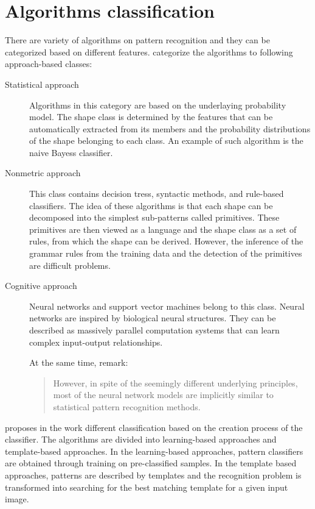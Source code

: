 \section{Algorithms classification}
There are variety of algorithms on pattern recognition and they can be categorized based on different features. \citet{imageRecognition} categorize the algorithms to following approach-based classes:
\begin{description}
\item [Statistical approach] Algorithms in this category are based on the underlaying probability model. The shape class is determined by the features that can be automatically extracted from its members and the probability distributions of the shape belonging to each class. An example of such algorithm is the naive Bayess classifier.

\item [Nonmetric approach] This class contains decision tress, syntactic methods, and rule-based classifiers. The idea of these algorithms is that each shape can be decomposed into the simplest sub-patterns called primitives. These primitives are then viewed as a language and the shape class as a set of rules, from which the shape can be derived. However, the inference of the grammar rules from the training data and the detection of the primitives are difficult problems.

\item [Cognitive approach] Neural networks and support vector machines belong to this class. Neural networks are inspired by biological neural structures. They can be described as massively parallel computation systems that can learn complex input-output relationships.

At the same time, \cite{imageRecognition} remark:
\begin{quotation} However, in spite of the seemingly different underlying principles, most of the neural network models are implicitly similar to statistical pattern recognition methods. \end{quotation}

\end{description}

\cite{skeletonMatching} proposes in the work different classification based on the creation process of the classifier. The algorithms are divided into learning-based approaches and template-based approaches. In the learning-based approaches, pattern classifiers are obtained through training on pre-classified samples. In the template based approaches, patterns are described by templates and the recognition problem is transformed into searching for the best matching template for a given input image.

